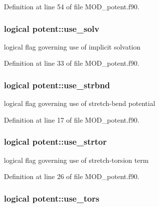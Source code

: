 Definition at line 54 of file M\-O\-D\-\_\-potent.\-f90.

\hypertarget{classpotent_ad939cbd8d4c142586515412465220ee8}{
\subsubsection[{use\-\_\-solv}]{\setlength{\rightskip}{0pt plus 5cm}logical potent\-::use\-\_\-solv}}\label{classpotent_ad939cbd8d4c142586515412465220ee8}


logical flag governing use of implicit solvation 



Definition at line 33 of file M\-O\-D\-\_\-potent.\-f90.

\hypertarget{classpotent_a75d75048b13b8eaf16d15061071a2baf}{
\subsubsection[{use\-\_\-strbnd}]{\setlength{\rightskip}{0pt plus 5cm}logical potent\-::use\-\_\-strbnd}}\label{classpotent_a75d75048b13b8eaf16d15061071a2baf}


logical flag governing use of stretch-\/bend potential 



Definition at line 17 of file M\-O\-D\-\_\-potent.\-f90.

\hypertarget{classpotent_a16df509b867b4c670a70473bd651ca73}{
\subsubsection[{use\-\_\-strtor}]{\setlength{\rightskip}{0pt plus 5cm}logical potent\-::use\-\_\-strtor}}\label{classpotent_a16df509b867b4c670a70473bd651ca73}


logical flag governing use of stretch-\/torsion term 



Definition at line 26 of file M\-O\-D\-\_\-potent.\-f90.

\hypertarget{classpotent_a858f360374fa731c40259fb25072a2b8}{
\subsubsection[{use\-\_\-tors}]{\setlength{\rightskip}{0pt plus 5cm}logical potent\-::use\-\_\-tors}}\label{classpotent_a858f360374fa731c40259fb25072a2b8}


